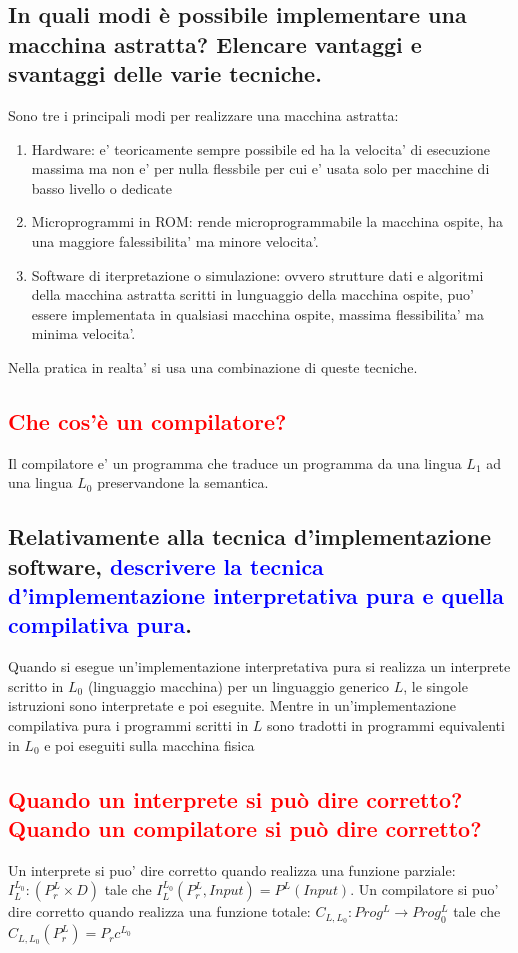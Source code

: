 \documentclass{article}
\begin{document}
\subsection{In quali modi è possibile implementare una macchina astratta? Elencare vantaggi e svantaggi delle varie tecniche.}
Sono tre i principali modi per realizzare una macchina astratta:
\begin{enumerate}
    \item Hardware: e' teoricamente sempre possibile ed ha la velocita' di esecuzione
          massima ma non e' per nulla flessbile per cui e' usata solo per macchine di
          basso livello o dedicate
    \item Microprogrammi in ROM: rende microprogrammabile la macchina ospite, ha una
          maggiore falessibilita' ma minore velocita'.
    \item Software di iterpretazione o simulazione: ovvero strutture dati e algoritmi
          della macchina astratta scritti in lunguaggio della macchina ospite, puo'
          essere implementata in qualsiasi macchina ospite, massima flessibilita' ma
          minima velocita'.
\end{enumerate}
Nella pratica in realta' si usa una combinazione di queste tecniche.
\subsection{\textcolor{red}{Che cos'è un compilatore?}}
Il compilatore e' un programma che traduce un programma da una lingua $L_1$ ad una lingua $L_0$ preservandone la semantica.
\subsection{Relativamente alla tecnica d'implementazione software, \textcolor{blue}{descrivere la tecnica d'implementazione interpretativa pura e quella compilativa pura}.}
Quando si esegue un'implementazione interpretativa pura si realizza un interprete scritto in $L_0$ (linguaggio macchina) per un linguaggio generico $L$, le singole istruzioni sono interpretate e poi eseguite.
Mentre in un'implementazione compilativa pura i programmi scritti in $L$ sono tradotti in programmi equivalenti in $L_0$ e poi eseguiti sulla macchina fisica

\subsection{\textcolor{red}{Quando un interprete si può dire corretto? Quando un compilatore si può dire corretto?}}
Un interprete si puo' dire corretto quando realizza una funzione parziale: $I^{L_0}_{L}: (P_r^{L} \times D)$  tale che $I_L^{L_0}(P_r^L, Input) = P^L(Input)$.
Un compilatore si puo' dire corretto quando realizza una funzione totale: $C_{L,L_0}:Prog^L \to Prog^L_0$ tale che $C_{L,L_0}(P_r^L)=P_rc^{L_0}$
\end{document}
